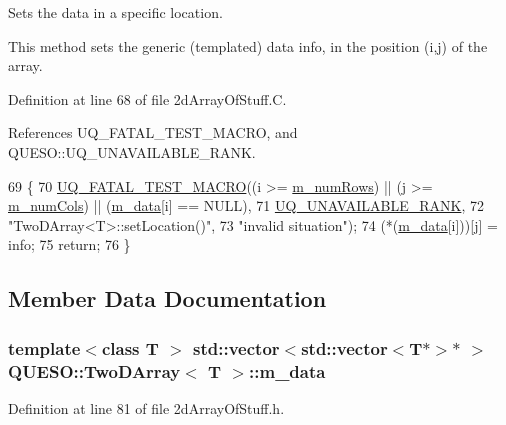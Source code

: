 Sets the data in a specific location. 

This method sets the generic (templated) data {\ttfamily info}, in the position {\ttfamily (i,j)} of the array. 

Definition at line 68 of file 2d\-Array\-Of\-Stuff.\-C.



References U\-Q\-\_\-\-F\-A\-T\-A\-L\-\_\-\-T\-E\-S\-T\-\_\-\-M\-A\-C\-R\-O, and Q\-U\-E\-S\-O\-::\-U\-Q\-\_\-\-U\-N\-A\-V\-A\-I\-L\-A\-B\-L\-E\-\_\-\-R\-A\-N\-K.


\begin{DoxyCode}
69 \{
70   \hyperlink{_defines_8h_a56d63d18d0a6d45757de47fcc06f574d}{UQ\_FATAL\_TEST\_MACRO}((i >= \hyperlink{class_q_u_e_s_o_1_1_two_d_array_a26fc2685fae9aa7aa0fecfaa52e6c617}{m\_numRows}) || (j >= 
      \hyperlink{class_q_u_e_s_o_1_1_two_d_array_adab8e60a3daa621f75681326478eb085}{m\_numCols}) || (\hyperlink{class_q_u_e_s_o_1_1_two_d_array_a89e1d31bfba6f86f5fa9c407aba7f00e}{m\_data}[i] == NULL),
71                       \hyperlink{namespace_q_u_e_s_o_a7d4679800a430ae8e473c1c7bc0bfb21}{UQ\_UNAVAILABLE\_RANK},
72                       \textcolor{stringliteral}{"TwoDArray<T>::setLocation()"},
73                       \textcolor{stringliteral}{"invalid situation"});
74   (*(\hyperlink{class_q_u_e_s_o_1_1_two_d_array_a89e1d31bfba6f86f5fa9c407aba7f00e}{m\_data}[i]))[j] = info;
75   \textcolor{keywordflow}{return};
76 \}
\end{DoxyCode}


\subsection{Member Data Documentation}
\hypertarget{class_q_u_e_s_o_1_1_two_d_array_a89e1d31bfba6f86f5fa9c407aba7f00e}{
\subsubsection[{m\-\_\-data}]{\setlength{\rightskip}{0pt plus 5cm}template$<$class T $>$ std\-::vector$<$std\-::vector$<$T$\ast$$>$$\ast$ $>$ {\bf Q\-U\-E\-S\-O\-::\-Two\-D\-Array}$<$ T $>$\-::m\-\_\-data\hspace{0.3cm}{\ttfamily [private]}}}\label{class_q_u_e_s_o_1_1_two_d_array_a89e1d31bfba6f86f5fa9c407aba7f00e}


Definition at line 81 of file 2d\-Array\-Of\-Stuff.\-h.



